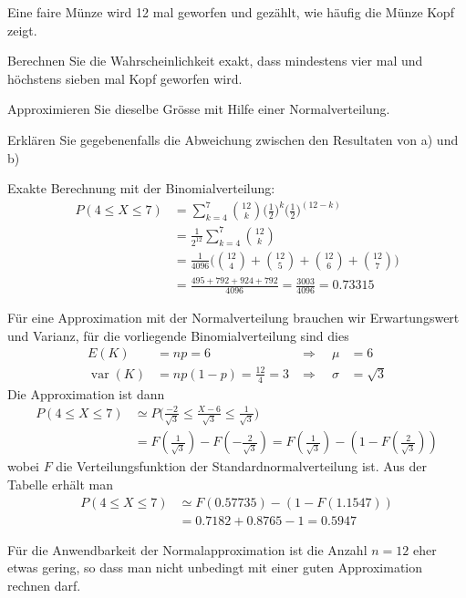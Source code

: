 Eine faire Münze wird 12 mal geworfen und gezählt, wie häufig die
Münze Kopf zeigt.
\begin{teilaufgaben}
\item Berechnen Sie die Wahrscheinlichkeit exakt, dass mindestens vier mal
und höchstens sieben mal Kopf geworfen wird.
\item Approximieren Sie dieselbe Grösse mit Hilfe einer Normalverteilung.
\item Erklären Sie gegebenenfalls die Abweichung zwischen den Resultaten
von a) und b)
\end{teilaufgaben}


\begin{loesung}
\begin{teilaufgaben}
\item Exakte Berechnung mit der Binomialverteilung:
\begin{align*}
P(4\le X\le 7)&=\sum_{k=4}^7\binom{12}{k}
\biggl(\frac12\biggr)^k
\biggl(\frac12\biggr)^{(12-k)}
\\
&=\frac1{2^{12}}\sum_{k=4}^{7}\binom{12}{k}
\\
&=\frac1{4096}\biggl(
\binom{12}{4}+
\binom{12}{5}+
\binom{12}{6}+
\binom{12}{7}
\biggr)
\\
&=\frac{495+792+924+792}{4096}
=
\frac{3003}{4096}=0.73315
\end{align*}
\item
Für eine Approximation mit der Normalverteilung brauchen wir Erwartungswert
und Varianz, für die vorliegende Binomialverteilung sind dies
\begin{align*}
E(K) &=np=6
&\Rightarrow\quad\mu&=6
\\
\operatorname{var}(K)&=np(1-p)=\frac{12}{4}=3
&\Rightarrow\quad\sigma&=\sqrt{3}
\end{align*}
Die Approximation ist dann
\begin{align*}
P(4\le X\le 7)
&\simeq
P\biggl(
\frac{-2}{\sqrt{3}}\le \frac{X-6}{\sqrt{3}}\le \frac1{\sqrt{3}}
\biggr)
\\
&=F(\frac1{\sqrt{3}})-F(-\frac2{\sqrt{3}})
=F(\frac1{\sqrt{3}})-(1-F(\frac2{\sqrt{3}}))
\end{align*}
wobei $F$ die Verteilungsfunktion der Standardnormalverteilung ist. Aus
der Tabelle erhält man
\begin{align*}
P(4\le X\le 7)
&\simeq
F(0.57735) - (1-F(1.1547))
\\
&=0.7182 + 0.8765 - 1=0.5947
\end{align*}
\item
Für die Anwendbarkeit der Normalapproximation ist die Anzahl $n=12$
eher etwas gering, so dass man nicht unbedingt mit einer guten Approximation
rechnen darf.


\end{teilaufgaben}
\end{loesung}
